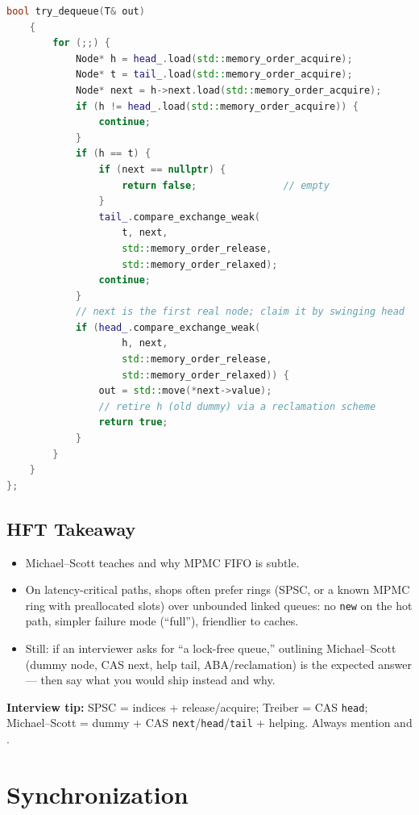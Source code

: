 \begin{lstlisting}[language=C++]
    bool try_dequeue(T& out)
    {
        for (;;) {
            Node* h = head_.load(std::memory_order_acquire);
            Node* t = tail_.load(std::memory_order_acquire);
            Node* next = h->next.load(std::memory_order_acquire);
            if (h != head_.load(std::memory_order_acquire)) {
                continue;
            }
            if (h == t) {
                if (next == nullptr) {
                    return false;               // empty
                }
                tail_.compare_exchange_weak(
                    t, next,
                    std::memory_order_release,
                    std::memory_order_relaxed);
                continue;
            }
            // next is the first real node; claim it by swinging head
            if (head_.compare_exchange_weak(
                    h, next,
                    std::memory_order_release,
                    std::memory_order_relaxed)) {
                out = std::move(*next->value);
                // retire h (old dummy) via a reclamation scheme
                return true;
            }
        }
    }
};
\end{lstlisting}

\subsection{HFT Takeaway}
\label{subsec:ms-hft-takeaway}
\begin{itemize}
    \item Michael--Scott teaches  and why MPMC FIFO is subtle.
    \item On latency-critical paths, shops often prefer  rings 
          (SPSC, or a known MPMC ring with preallocated slots) over unbounded 
          linked queues: no \texttt{new} on the hot path, simpler failure mode 
          (``full''), friendlier to caches.
    \item Still: if an interviewer asks for ``a lock-free queue,'' outlining 
          Michael--Scott (dummy node, CAS next, help tail, ABA/reclamation) is the 
          expected answer --- then say what you would ship instead and why.
\end{itemize}
\par\noindent\textbf{Interview tip:} SPSC = indices + release/acquire; Treiber = CAS 
\texttt{head}; Michael--Scott = dummy + CAS \texttt{next}/\texttt{head}/\texttt{tail} 
+ helping. Always mention  and .

\section{Synchronization}
\label{sec:synchronization-theory}

